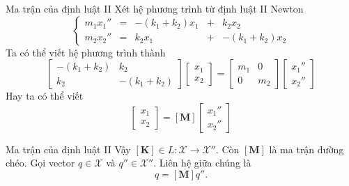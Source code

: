 \begin{frame}{Ma trận của định luật II}
Xét hệ phương trình từ định luật II Newton
    \begin{equation*}
    \left\{
    \begin{array}{cccccc}
    m_1 x_1'' &=& - (k_1+k_2) x_1 &+& k_2 x_2 \\
    m_2 x_2'' &=&  k_2 x_1 &+& -(k_1+ k_2) x_2
    \end{array}
    \right.
    \end{equation*}
Ta có thể viết hệ phương trình thành
\begin{equation}
    \left[
    \begin{array}{cc}
    -(k_1+k_2) & k_2 \\
    k_2 & -(k_1+ k_2)
    \end{array}
    \right] 
    \left[
    \begin{array}{c}
    x_1 \\
    x_2
    \end{array}
    \right] =  
    \left[
    \begin{array}{cc}
    m_1 & 0 \\
    0 & m_2 
    \end{array}
    \right] 
    \left[
    \begin{array}{c}
    x_1'' \\
    x_2''
    \end{array}
    \right]
    \label{eq:3.3_1}
\end{equation}
Hay ta có thể viết
\begin{equation}
    [\mathbf{K}] 
    \left[
    \begin{array}{c}
    x_1 \\
    x_2
    \end{array}
    \right]= [\mathbf{M}] 
    \left[
    \begin{array}{c}
    x_1'' \\
    x_2''
    \end{array}
    \right]
    \label{eq:3.3_2}
\end{equation}
\end{frame}

\begin{frame}{Ma trận của định luật II}
    Vậy \([\mathbf{K}] \in L : \mathcal{X} \rightarrow \mathcal{X}''\). Còn \([\mathbf{M}]\) là ma trận đường chéo. Gọi vector \(q \in \mathcal{X}\) và \(q'' \in \mathcal{X}''\). Liên hệ giữa chúng là
    \begin{equation}
        [\mathbf{K}] q = [\mathbf{M}] q''.
        \label{eq:3.3_3}
    \end{equation}
    \begin{center}
        \resizebox{0.7\linewidth}{!}{}
    \end{center}
\end{frame}